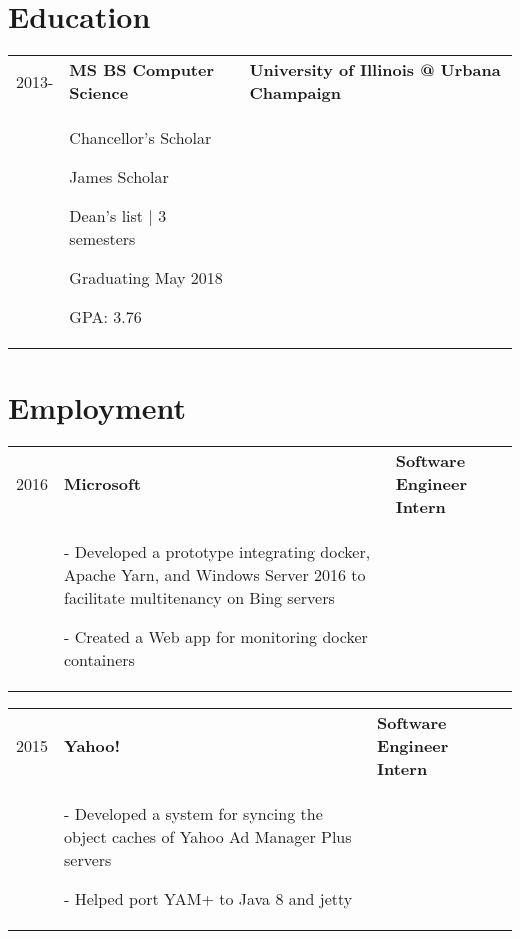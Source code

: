 \documentclass[letterpaper,10pt]{article}
\begin{document}
\begin{minipage}[t][0em][t]{0.8\textwidth}
  \section*{\huge Education}
\begin{tabular}{p{} p{} p{}}
  
  {2013-} & \textbf{MS BS Computer Science} & \textbf{\small University of Illinois @ Urbana Champaign}\\
  & {Chancellor's Scholar

James Scholar

Dean's list | 3 semesters

Graduating May 2018

GPA: 3.76
} & \\
\end{tabular}
  



\section*{\huge Employment}

\begin{tabular}{p{} p{} p{}}
  
  {2016} & \textbf{Microsoft} & \textbf{\small Software Engineer Intern}\\
  & {- Developed a prototype integrating docker, Apache Yarn, and Windows Server 2016 to facilitate multitenancy on Bing servers

- Created a Web app for monitoring docker containers} & \\
\end{tabular}

\begin{tabular}{p{} p{} p{}}
  
  {2015} & \textbf{Yahoo!} & \textbf{\small Software Engineer Intern}\\
  & {- Developed a system for syncing the object caches of Yahoo Ad Manager Plus servers

- Helped port YAM+ to Java 8 and jetty} & \\
\end{tabular}

\begin{tabular}{p{} p{} p{}}
  

\end{tabular}
\end{minipage}
\end{document}

